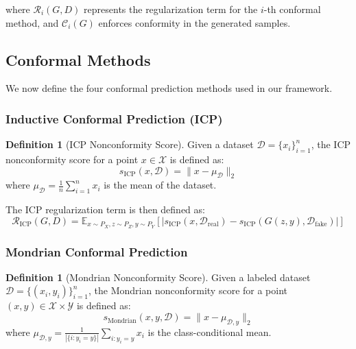 \documentclass{article}
\theoremstyle{plain}
\theoremstyle{definition}
\newtheorem{definition}[theorem]{Definition}
\theoremstyle{remark}
\begin{document}
where $\mathcal{R}_i(G, D)$ represents the regularization term for the $i$-th conformal method, and $\mathcal{C}_i(G)$ enforces conformity in the generated samples.

\subsection{Conformal Methods}
We now define the four conformal prediction methods used in our framework.

\subsubsection{Inductive Conformal Prediction (ICP)}

\begin{definition}[ICP Nonconformity Score]
Given a dataset $\mathcal{D} = \{x_i\}_{i=1}^n$, the ICP nonconformity score for a point $x \in \mathcal{X}$ is defined as:
\begin{equation}
s_{\text{ICP}}(x, \mathcal{D}) = \|x - \mu_{\mathcal{D}}\|_2
\end{equation}
where $\mu_{\mathcal{D}} = \frac{1}{n}\sum_{i=1}^n x_i$ is the mean of the dataset.
\end{definition}

The ICP regularization term is then defined as:
\begin{equation}
\mathcal{R}_{\text{ICP}}(G, D) = \mathbb{E}_{x \sim P_X, z \sim P_Z, y \sim P_Y}\left[|s_{\text{ICP}}(x, \mathcal{D}_{\text{real}}) - s_{\text{ICP}}(G(z, y), \mathcal{D}_{\text{fake}})|\right]
\end{equation}

\subsubsection{Mondrian Conformal Prediction}

\begin{definition}[Mondrian Nonconformity Score]
Given a labeled dataset $\mathcal{D} = \{(x_i, y_i)\}_{i=1}^n$, the Mondrian nonconformity score for a point $(x, y) \in \mathcal{X} \times \mathcal{Y}$ is defined as:
\begin{equation}
s_{\text{Mondrian}}(x, y, \mathcal{D}) = \|x - \mu_{\mathcal{D},y}\|_2
\end{equation}
where $\mu_{\mathcal{D},y} = \frac{1}{|\{i: y_i = y\}|}\sum_{i:y_i = y} x_i$ is the class-conditional mean.
\end{definition}
\end{document}
